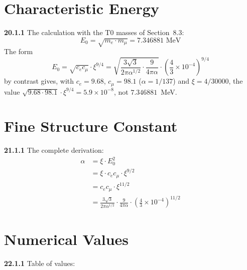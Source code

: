 \section{Characteristic Energy}
\noindent \textbf{20.1.1} The calculation with the T0 masses of Section~8.3:
\begin{equation}
	E_0 = \sqrt{m_e \cdot m_\mu} = 7.346881 \text{ MeV}
\end{equation}
The form
\begin{equation}
	E_0 = \sqrt{c_e c_\mu} \cdot \xi^{9/4} = \sqrt{\frac{3\sqrt{3}}{2\pi\alpha^{1/2}} \cdot \frac{9}{4\pi\alpha}} \cdot \left(\frac{4}{3} \times 10^{-4}\right)^{9/4}
\end{equation}
by contrast gives, with $c_e = 9.68$, $c_\mu = 98.1$ ($\alpha = 1/137$) and $\xi = 4/30000$, the value $\sqrt{9.68\cdot98.1}\cdot\xi^{9/4} = 5.9\times10^{-8}$, not $7.346881$~MeV.

\section{Fine Structure Constant}
\noindent \textbf{21.1.1} The complete derivation:
\begin{align}
	\alpha &= \xi \cdot E_0^2 \\
	&= \xi \cdot c_e c_\mu \cdot \xi^{9/2} \\
	&= c_e c_\mu \cdot \xi^{11/2} \\
	&= \frac{3\sqrt{3}}{2\pi\alpha^{1/2}} \cdot \frac{9}{4\pi\alpha} \cdot \left(\frac{4}{3} \times 10^{-4}\right)^{11/2}
\end{align}

\section{Numerical Values}

\noindent \textbf{22.1.1} Table of values:

\begin{table}[h]
	\centering
\end{table}

